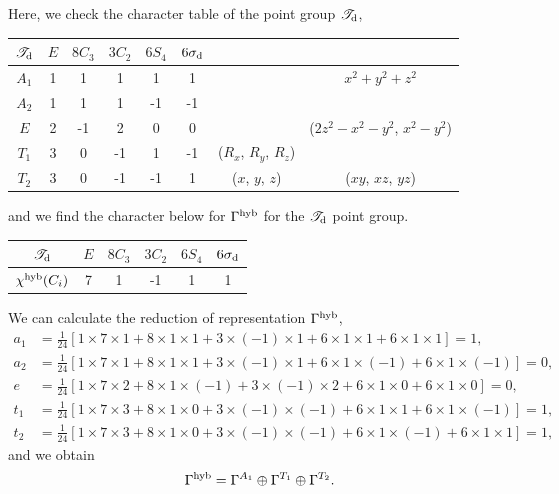 \documentclass[a4paper]{book}
\begin{document}
\begin{solution}
		Here, we check the character table of the point group $\mathscr{T}_{\rm d}$, \vspace{-0.5em}
		\begin{center}
		\begin{tabular}{cccccccc}\hline
	$\mathscr{T}_{\rm d}$ & $E$ & $8C_3$ &	$3C_2$	& $6S_4$	&	$6\sigma_{\rm d}$ &		&	\\ \hline
		$A_1$	&	1	&	1	&	1	&	1	&	1	&	& $x^2+y^2+z^2$	\\
		$A_2$	&	1	&	1	&	1	&	-1	&	-1	&	&	\\
		$E$		&	2	&	-1	&	2	&	0	&	0	&	& ($2z^2-x^2-y^2$, $x^2-y^2$)	\\
		$T_1$	&	3	&	0	&	-1	&	1	&	-1	& ($R_x$, $R_y$, $R_z$)	& 	\\
		$T_2$	&	3	&	0	&	-1	&	-1	&	1	& ($x$, $y$, $z$)	&	($xy$, $xz$, $yz$) 	\\ \hline
		\end{tabular}
		\end{center}
		and we find the character below for $\Gamma^{\rm hyb}$ for the $\mathscr{T}_{\rm d}$ point group.
		\begin{center}
		\begin{tabular}{cccccc} \hline
			$\mathscr{T}_{\rm d}$ & $E$ & $8C_3$ &	$3C_2$	& $6S_4$	&	$6\sigma_{\rm d}$	\\ \hline
			$\chi^{\rm hyb}(C_i)$ & 7 & 1 & -1 & 1 & 1 \\\hline
		\end{tabular}
		\end{center}
		
		We can calculate the reduction of representation $\Gamma^{\rm hyb}$,
		\begin{align*}
		a_1 &= \frac{1}{24} [ 1 \times 7 \times 1 + 8 \times 1 \times 1 + 3 \times (-1) \times 1 + 6 \times 1 \times 1 + 6 \times 1 \times 1 ] = 1 ,\\
		a_2 &= \frac{1}{24} [ 1 \times 7 \times 1 + 8 \times 1 \times 1 + 3 \times (-1) \times 1 + 6 \times 1 \times (-1) + 6 \times 1 \times (-1) ] = 0, \\
		e &= \frac{1}{24} [ 1 \times 7 \times 2 + 8 \times 1 \times (-1) + 3 \times (-1) \times 2 + 6 \times 1 \times 0 + 6 \times 1 \times 0 ] = 0, \\
		t_1 &= \frac{1}{24} [ 1 \times 7 \times 3 + 8 \times 1 \times 0 + 3 \times (-1) \times (-1) + 6 \times 1 \times 1 + 6 \times 1 \times (-1) ] = 1 ,\\
		t_2 &= \frac{1}{24} [ 1 \times 7 \times 3 + 8 \times 1 \times 0 + 3 \times (-1) \times (-1) + 6 \times 1 \times (-1) + 6 \times 1 \times 1 ] = 1 ,
		\end{align*}
		and we obtain
		\begin{equation}
			\Gamma^{\rm hyb} = \Gamma^{A_1} \oplus \Gamma^{T_1} \oplus \Gamma^{T_2}.
		\end{equation}
		

\end{solution}
\end{document}
